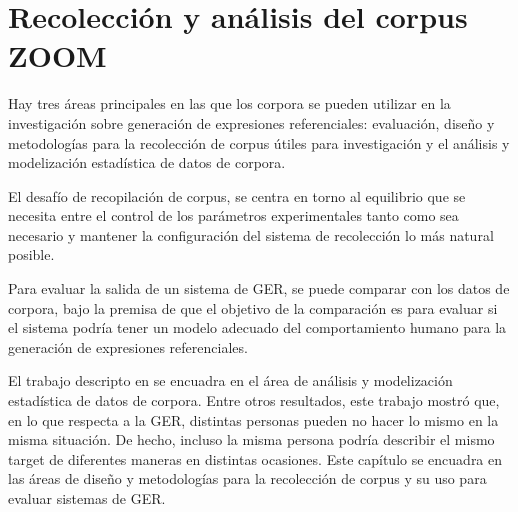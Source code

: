 \chapter{Recolecci\'on y an\'alisis del corpus ZOOM}
\label{sec:corpus}

Hay tres \'areas principales en las que los corpora se pueden utilizar en la investigaci\'on sobre generaci\'on de expresiones referenciales:
evaluaci\'on, dise\~no y metodolog\'ias para la recolecci\'on de corpus \'utiles para investigaci\'on y el an\'alisis y modelizaci\'on estad\'istica de datos de corpora.

El desaf\'io de recopilaci\'on de corpus, se centra en torno al equilibrio que se necesita
entre el control de los par\'ametros experimentales tanto como sea necesario
y mantener la configuraci\'on del sistema de recolecci\'on lo m\'as natural posible. 

Para evaluar la salida de un sistema de GER, se puede 
comparar con los datos de corpora, bajo la premisa de que el objetivo de la comparaci\'on es
para evaluar si el sistema podr\'ia tener un modelo adecuado del comportamiento humano para la generaci\'on de expresiones referenciales.

El trabajo descripto en \cite{viet:gene11} se encuadra en el \'area de an\'alisis y modelizaci\'on estad\'istica de datos de corpora. Entre otros resultados, este trabajo mostr\'o que, en lo que respecta a la GER, distintas personas pueden no  hacer lo mismo en la misma situaci\'on. De hecho, incluso la misma persona podr\'ia describir el mismo target de diferentes maneras en distintas ocasiones.
Este cap\'itulo se encuadra en las \'areas de dise\~no y metodolog\'ias para la recolecci\'on de corpus y su uso para evaluar sistemas de GER.

